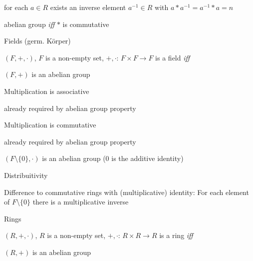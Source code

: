 \documentclass[landscape, a4paper]{article}
\begin{document}
\begin{minipage}[t]{0.2\linewidth}
\begin{betterlist}
\begin{betterlist}
\begin{betterlist}
\begin{betterlist}
					\item for each $a\in R$ exists an \alert{inverse element} $a^{-1}\in R$ with $a * a^{-1} = a^{-1} * a = n$
				\end{betterlist}
				\item \alert{abelian group} \textit{iff} $*$ is commutative
			\end{betterlist}
			\begin{betterlist}
				\item \alert{Fields (germ. Körper)}
				\begin{betterlist}
					\item $(F, +, \cdot)$, $F$ is a non-empty set, $+,\cdot$: $F \times F \rightarrow F$ is a \alert{field} \textit{iff}
					\begin{betterlist}
						\item $(F, +)$ is an \alert{abelian group}
						\item \alert{Multiplication} is \alert{associative}
						\begin{betterlist}
							\item already required by \alert{abelian group} property
						\end{betterlist}
						\item \alert{Multiplication} is \alert{commutative}
						\begin{betterlist}
							\item already required by \alert{abelian group} property
						\end{betterlist}
						\item $(F\setminus \{0\}, \cdot)$ is an \alert{abelian group} ($0$ is the additive identity)
						\item \alert{Distribuitivity}
					\end{betterlist}
					\item \alert{Difference} to \alert{commutative rings} with (multiplicative) identity: For each element of $F\setminus\{0\}$ there is a multiplicative inverse
				\end{betterlist}
			\end{betterlist}
			\begin{betterlist}
				\item \alert{Rings}
				\begin{betterlist}
					\item $(R, +, \cdot)$, $R$ is a non-empty set, $+,\cdot$: $R \times R \rightarrow R$ is a \alert{ring} \textit{iff}
					\begin{betterlist}
						\item $(R, +)$ is an \alert{abelian group}

\end{betterlist}
\end{betterlist}
\end{betterlist}
\end{betterlist}
\end{betterlist}
\end{minipage}
\end{document}
